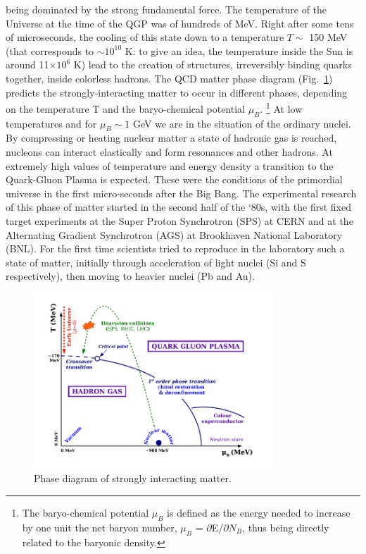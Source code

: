 being dominated by the strong fundamental force.
The temperature of the Universe at the time of the QGP 
was of hundreds of MeV.
Right after some tens of microseconds, the cooling of this state down to 
a temperature $T \sim$ 150 MeV (that corresponds to $\sim 10^{10}$ K: to give an idea, the temperature inside the Sun is 
around 11$\times 10^{6}$ K) lead to the 
creation of structures, irreversibly binding quarks together, inside colorless
hadrons. The QCD matter phase diagram (Fig.~\ref{fig:QCDphase}) predicts the 
strongly-interacting matter to occur in different phases, depending on the 
temperature T and the baryo-chemical potential $\mu_{B}$. \footnote{The baryo-chemical potential $\mu_{B}$ is defined as 
the energy needed to increase by one unit the net baryon number, 
$\mu_{B}$ = $\partial$E/$\partial N_B$, thus being directly related to the baryonic density.} 
At low temperatures and for $\mu_{B} \sim 1$ GeV we are in the situation of the 
ordinary nuclei. By compressing or heating nuclear matter a state of 
hadronic gas is reached, nucleons can interact elastically and form resonances and other hadrons. 
At extremely high values of temperature and energy density a transition to the Quark-Gluon 
Plasma is expected. These were the conditions of the primordial universe in the
first micro-seconds after the Big Bang.
The experimental research of this phase of matter started in the second half of the `80s, 
with the first fixed target experiments at the Super Proton Synchrotron (SPS) at CERN and at the Alternating Gradient Synchrotron (AGS) at 
Brookhaven National Laboratory (BNL). For the first time scientists tried to 
reproduce in the laboratory such a state of matter, initially through acceleration 
of light nuclei (Si and S respectively), then moving to heavier nuclei (Pb and Au).\\


\begin{figure}[h!]
\centering
 \includegraphics[width=0.8\textwidth] {FigCap1/QCDphase.jpeg}
\caption{Phase diagram of strongly interacting matter.}
\label{fig:QCDphase}
\end{figure}


